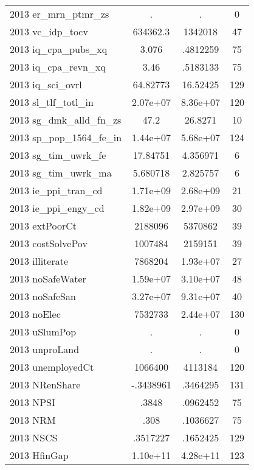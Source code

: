 {\begin{tabular}{l*{1}{ccc}}
2013 er\_mrn\_ptmr\_zs &           .&           .&           0\\
2013 vc\_idp\_tocv    &    634362.3&     1342018&          47\\
2013 iq\_cpa\_pubs\_xq &       3.076&    .4812259&          75\\
2013 iq\_cpa\_revn\_xq &        3.46&    .5183133&          75\\
2013 iq\_sci\_ovrl    &    64.82773&    16.52425&         129\\
2013 sl\_tlf\_totl\_in &    2.07e+07&    8.36e+07&         120\\
2013 sg\_dmk\_alld\_fn\_zs&        47.2&     26.8271&          10\\
2013 sp\_pop\_1564\_fe\_in&    1.44e+07&    5.68e+07&         124\\
2013 sg\_tim\_uwrk\_fe &    17.84751&    4.356971&           6\\
2013 sg\_tim\_uwrk\_ma &    5.680718&    2.825757&           6\\
2013 ie\_ppi\_tran\_cd &    1.71e+09&    2.68e+09&          21\\
2013 ie\_ppi\_engy\_cd &    1.82e+09&    2.97e+09&          30\\
2013 extPoorCt      &     2188096&     5370862&          39\\
2013 costSolvePov   &     1007484&     2159151&          39\\
2013 illiterate     &     7868204&    1.93e+07&          27\\
2013 noSafeWater    &    1.59e+07&    3.10e+07&          48\\
2013 noSafeSan      &    3.27e+07&    9.31e+07&          40\\
2013 noElec         &     7532733&    2.44e+07&         130\\
2013 uSlumPop       &           .&           .&           0\\
2013 unproLand      &           .&           .&           0\\
2013 unemployedCt   &     1066400&     4113184&         120\\
2013 NRenShare      &   -.3438961&    .3464295&         131\\
2013 NPSI           &       .3848&    .0962452&          75\\
2013 NRM            &        .308&    .1036627&          75\\
2013 NSCS           &    .3517227&    .1652425&         129\\
2013 HfinGap        &    1.10e+11&    4.28e+11&         123\\

\end{tabular}}
